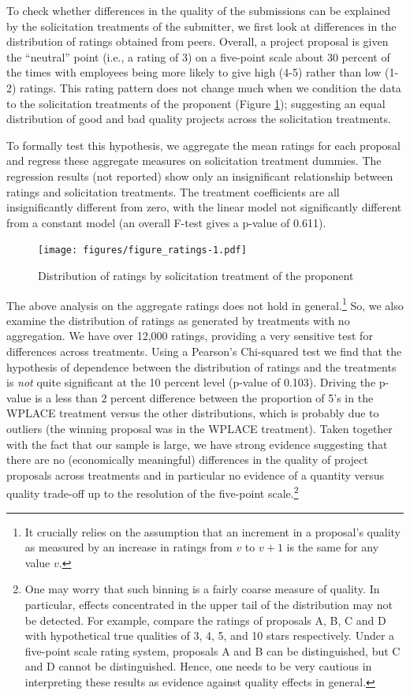 \documentclass[12pt, titlepage]{article}
\begin{document}
To check whether differences in the quality of the submissions can be
explained by the solicitation treatments of the submitter, we first look
at differences in the distribution of ratings obtained from peers.
Overall, a project proposal is given the ``neutral'' point (i.e., a
rating of 3) on a five-point scale about 30 percent of the times with
employees being more likely to give high (4-5) rather than low (1-2)
ratings. This rating pattern does not change much when we condition the
data to the solicitation treatments of the proponent (Figure
\ref{ratings}); suggesting an equal distribution of good and bad quality
projects across the solicitation treatments.

To formally test this hypothesis, we aggregate the mean ratings for each
proposal and regress these aggregate measures on solicitation treatment
dummies. The regression results (not reported) show only an
insignificant relationship between ratings and solicitation treatments.
The treatment coefficients are all insignificantly different from zero,
with the linear model not significantly different from a constant model
(an overall F-test gives a p-value of 0.611).

\begin{figure}
  \centering
  \caption{Distribution of ratings by solicitation treatment of the proponent}
  \label{ratings}
  \texttt{[image: figures/figure\_ratings-1.pdf]}
\end{figure}

The above analysis on the aggregate ratings does not hold in
general.\footnote{It crucially relies on the assumption that an
  increment in a proposal's quality as measured by an increase in
  ratings from \(v\) to \(v+1\) is the same for any value \(v\).} So, we
also examine the distribution of ratings as generated by treatments with
no aggregation. We have over 12,000 ratings, providing a very sensitive
test for differences across treatments. Using a Pearson's Chi-squared
test we find that the hypothesis of dependence between the distribution
of ratings and the treatments is \emph{not} quite significant at the 10
percent level (p-value of 0.103). Driving the p-value is a less than
\(2\) percent difference between the proportion of 5's in the WPLACE
treatment versus the other distributions, which is probably due to
outliers (the winning proposal was in the WPLACE treatment). Taken
together with the fact that our sample is large, we have strong evidence
suggesting that there are no (economically meaningful) differences in
the quality of project proposals across treatments and in particular no
evidence of a quantity versus quality trade-off up to the resolution of
the five-point scale.\footnote{One may worry that such binning is a
  fairly coarse measure of quality. In particular, effects concentrated
  in the upper tail of the distribution may not be detected. For
  example, compare the ratings of proposals A, B, C and D with
  hypothetical true qualities of 3, 4, 5, and 10 stars respectively.
  Under a five-point scale rating system, proposals A and B can be
  distinguished, but C and D cannot be distinguished. Hence, one needs
  to be very cautious in interpreting these results as evidence against
  quality effects in general.}
\end{document}
